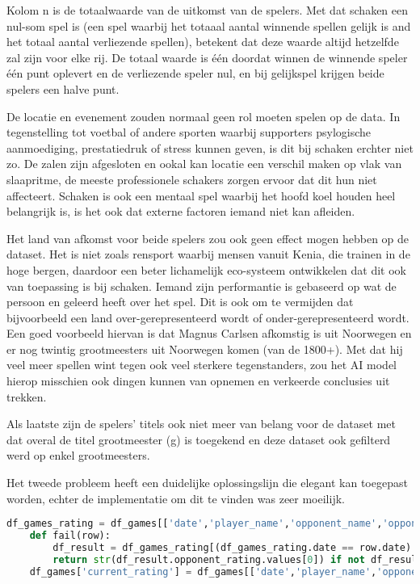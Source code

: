 Kolom n is de totaalwaarde van de uitkomst van de spelers. Met dat schaken een nul-som spel is (een spel waarbij het totaaal aantal winnende spellen gelijk is and het totaal aantal verliezende spellen), betekent dat deze waarde altijd hetzelfde zal zijn voor elke rij. De totaal waarde is één doordat winnen de winnende speler één punt oplevert en de verliezende speler nul, en bij gelijkspel krijgen beide spelers een halve punt. 

De locatie en evenement zouden normaal geen rol moeten spelen op de data. In tegenstelling tot voetbal of andere sporten waarbij supporters psylogische aanmoediging, prestatiedruk of stress kunnen geven, is dit bij schaken erchter niet zo. De zalen zijn afgesloten en ookal kan locatie een verschil maken op vlak van slaapritme, de meeste professionele schakers zorgen ervoor dat dit hun niet affecteert. Schaken is ook een mentaal spel waarbij het hoofd koel houden heel belangrijk is, is het ook dat externe factoren iemand niet kan afleiden. 

Het land van afkomst voor beide spelers zou ook geen effect mogen hebben op de dataset. Het is niet zoals rensport waarbij mensen vanuit Kenia, die trainen in de hoge bergen, daardoor een beter lichamelijk eco-systeem ontwikkelen dat dit ook van toepassing is bij schaken. Iemand zijn performantie is gebaseerd op wat de persoon en geleerd heeft over het spel. Dit is ook om te vermijden dat bijvoorbeeld een land over-gerepresenteerd wordt of onder-gerepresenteerd wordt. Een goed voorbeeld hiervan is dat Magnus Carlsen afkomstig is uit Noorwegen en er nog twintig grootmeesters uit Noorwegen komen (van de 1800+). Met dat hij veel meer spellen wint tegen ook veel sterkere tegenstanders, zou het AI model hierop misschien ook dingen kunnen van opnemen en verkeerde conclusies uit trekken.

Als laatste zijn de spelers' titels ook niet meer van belang voor de dataset met dat overal de titel grootmeester (g) is toegekend en deze dataset ook gefilterd werd op enkel grootmeesters.

Het tweede probleem heeft een duidelijke oplossingslijn die elegant kan toegepast worden, echter de implementatie om dit te vinden was zeer moeilijk. 

\begin{lstlisting}[language=Python]
    df_games_rating = df_games[['date','player_name','opponent_name','opponent_rating']]
    def fail(row):
        df_result = df_games_rating[(df_games_rating.date == row.date) & (df_games_rating.player_name == row.opponent_name) & (df_games_rating.opponent_name == row.player_name)]
        return str(df_result.opponent_rating.values[0]) if not df_result.empty else ''
    df_games['current_rating'] = df_games[['date','player_name','opponent_name','opponent_rating']].apply(fail, axis=1)
\end{lstlisting}

